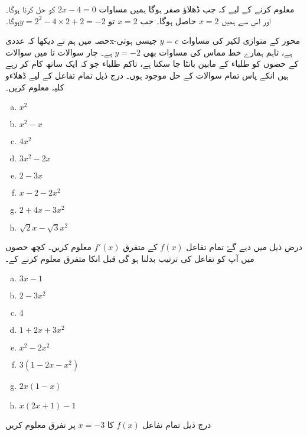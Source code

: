   معلوم کرنے کے لیے کہ جب ڈھلاؤ صفر ہوگا ہمیں مساوات $ 2x-4=0 $ کو حل کرنا ہوگا۔ اور اس سے ہمیں  $x=2 $ حاصل ہوگا۔ جب  $x=2 $ تو  \(   y=2^2-4\times 2+2=-2  \)ہوگا۔

حصہ   میں ہم نے دیکھا کہ عددی{x}-محور کے متوازی لکیر کی مساوات $y=c$ جیسی ہوتی ہے، تاہم ہمارے خط مماس کی مساوات بھی  $y=-2 $ ہے۔
چار سوالات  تا  میں سوالات کے حصوں کو طلباء کے مابین بانٹا جا سکتا ہے، تاکم طلباء جو کہ ایک ساتھ کام کر رہے ہیں انکے پاس تمام سوالات کے حل موجود ہوں۔
درج ذیل تمام تفاعل کے لیے ڈھلاءو کلیہ معلوم کریں۔
\begin{multicols}{4}     
 \begin{enumerate}[a.]
\item  \(  x^2    \)
\item  \(    x^2-x  \)
\item  \(    4x^2   \)
\item  \(   3x^2-2x   \)
\item  \(   2-3x     \)
\item  \(  x-2-2x^2     \)
\item  \(    2+4x-3x^2  \)
\item  \(    \sqrt{2}x-\sqrt{3}x^2   \)
\end{enumerate}
 \end{multicols}
درض ذیل میں دیے گۓ تمام تفاعل $ f(x)$ کے متفرق  $f'(x)$ معلوم کریں۔ کچھ حصوں میں آپ کو تفاعل کی ترتیب بدلنا ہو گی قبل انکا متفرق معلوم کرنے کے۔
\begin{multicols}{4}     
 \begin{enumerate}[a.]
\item  \( 3x-1    \)
\item  \(   2-3x^2  \)
\item  \(  4\)
\item  \(   1+2x+3x^2 \)
\item  \( x^2-2x^2      \)
\item  \(3(1-2x-x^2)    \)
\item  \(  2x(1-x) \)
\item  \(   x(2x+1)-1   \)
\end{enumerate}
 \end{multicols}
درج ذیل تمام تفاعل \(f(x)\) کا \(x=-3\) پر تفرق معلوم کریں
 
